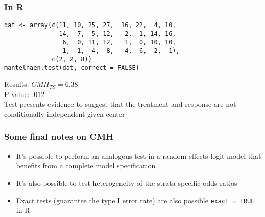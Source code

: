 \documentclass[aspectratio=169]{beamer}
\begin{document}
\begin{frame}[fragile]\frametitle{In R}
\begin{verbatim}
dat <- array(c(11, 10, 25, 27,  16, 22,  4, 10,
               14,  7,  5, 12,   2,  1, 14, 16,
                6,  0, 11, 12,   1,  0, 10, 10,
                1,  1,  4,  8,   4,  6,  2,  1),
             c(2, 2, 8))
mantelhaen.test(dat, correct = FALSE)
\end{verbatim}
Results: $CMH_{TS} = 6.38$ \\
P-value: $.012$ \\
Test presents evidence to suggest that the treatment and
response are not conditionally independent given center
\end{frame}

\begin{frame}\frametitle{Some final notes on CMH}
\begin{itemize}
\item It's possible to perform an analogous test in a random effects
  logit model that benefits from a complete model specification
\item It's also possible to test heterogeneity of the strata-specific
  odds ratios
\item Exact tests (guarantee the type I error rate) are also possible
  \texttt{exact = TRUE} in R
\end{itemize}
\end{frame}
\end{document}
